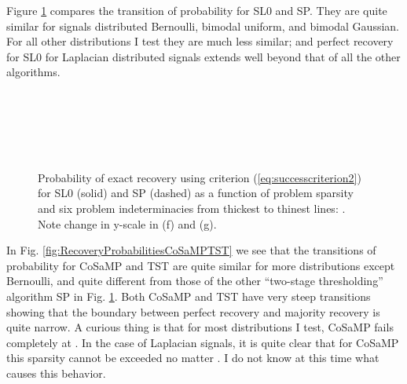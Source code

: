 \documentclass[11pt,draftcls,onecolumn]{IEEEtran}
\begin{document}
Figure \ref{fig:RecoveryProbabilitiesSL0SP} compares the transition
of probability for SL0 and SP.
They are quite similar for signals distributed 
Bernoulli, bimodal uniform, and bimodal Gaussian.
For all other distributions I test they are much less similar;
and perfect recovery for SL0 for Laplacian distributed signals
extends well beyond that of all the other algorithms.

\begin{figure}[htb]
\centering
{}\hspace{-0.1in}
\\ \vspace{-0.1in}

\hspace{-0.1in}
\\ \vspace{-0.1in}

\hspace{-0.1in}
\\ \vspace{-0.1in}

\caption{Probability of exact recovery using criterion (\ref{eq:successcriterion2}) 
for SL0 (solid) and SP (dashed) as a function of problem sparsity
and six problem indeterminacies from thickest to thinest lines: 
.
Note change in y-scale in (f) and (g).}
\label{fig:RecoveryProbabilitiesSL0SP}
\end{figure}

In Fig. \ref{fig:RecoveryProbabilitiesCoSaMPTST} we see that 
the transitions of probability for CoSaMP and TST are quite similar for 
more distributions except Bernoulli,
and quite different from those of the other ``two-stage thresholding'' algorithm SP in
Fig. \ref{fig:RecoveryProbabilitiesSL0SP}.
Both CoSaMP and TST have very steep transitions
showing that the boundary between perfect recovery
and majority recovery is quite narrow.
A curious thing is that for most distributions I test, 
CoSaMP fails completely at .
In the case of Laplacian signals,
it is quite clear that for CoSaMP this sparsity 
cannot be exceeded no matter .
I do not know at this time what causes this behavior.
\end{document}
